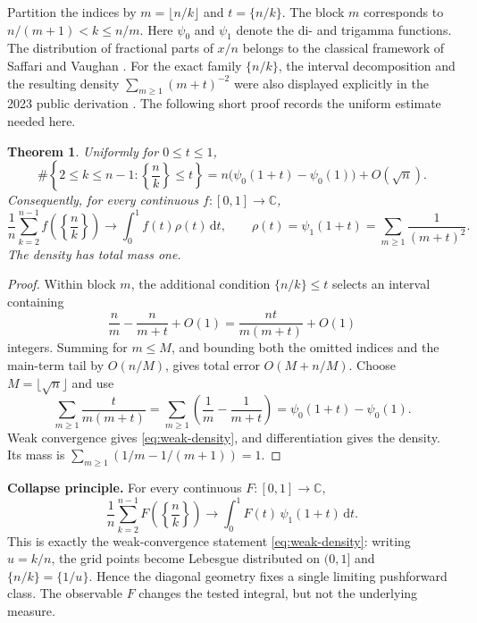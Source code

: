 \documentclass[11pt]{amsart}
\numberwithin{equation}{section}
\newtheorem{theorem}{Theorem}[section]
\theoremstyle{definition}
\theoremstyle{remark}
\newcommand{\C}{\mathbb C}
\newcommand{\dd}{\,\mathrm d}
\begin{document}
Partition the indices by
\(m=\lfloor n/k\rfloor\) and \(t=\{n/k\}\).  The block \(m\)
corresponds to \(n/(m+1)<k\leq n/m\).
Here \(\psi_0\) and \(\psi_1\) denote the di- and trigamma functions.
The distribution of fractional parts of \(x/n\) belongs to the classical
framework of Saffari and Vaughan \cite{SaffariVaughan1977}.  For the exact
family \(\{n/k\}\), the interval decomposition and the resulting density
\(\sum_{m\geq1}(m+t)^{-2}\) were also displayed explicitly in the 2023
public derivation \cite{MikeTeX2023}.  The following short proof records the
uniform estimate needed here.

\begin{theorem}\label{thm:block-count}
Uniformly for \(0\leq t\leq1\),
\begin{equation}\label{eq:block-count}
 \#\left\{2\leq k\leq n-1:\left\{\frac nk\right\}\leq t\right\}
 =n\bigl(\psi_0(1+t)-\psi_0(1)\bigr)+O(\sqrt n).
\end{equation}
Consequently, for every continuous \(f:[0,1]\to\C\),
\begin{equation}\label{eq:weak-density}
 \frac1n\sum_{k=2}^{n-1}f\!\left(\left\{\frac nk\right\}\right)
 \longrightarrow\int_0^1 f(t)\rho(t)\dd t,
 \qquad
 \rho(t)=\psi_1(1+t)=\sum_{m\geq1}\frac1{(m+t)^2}.
\end{equation}
The density has total mass one.
\end{theorem}

\begin{proof}
Within block \(m\), the additional condition \(\{n/k\}\leq t\) selects
an interval containing
\[
 \frac{n}{m}-\frac{n}{m+t}+O(1)
 =\frac{nt}{m(m+t)}+O(1)
\]
integers.  Summing for \(m\leq M\), and bounding both the omitted indices
and the main-term tail by \(O(n/M)\), gives total error
\(O(M+n/M)\).  Choose \(M=\lfloor\sqrt n\rfloor\) and use
\[
 \sum_{m\geq1}\frac{t}{m(m+t)}
 =\sum_{m\geq1}\left(\frac1m-\frac1{m+t}\right)
 =\psi_0(1+t)-\psi_0(1).
\]
Weak convergence gives \eqref{eq:weak-density}, and differentiation gives
the density.  Its mass is
\(\sum_{m\geq1}(1/m-1/(m+1))=1\).
\end{proof}

\medskip
\noindent\textbf{Collapse principle.}
For every continuous \(F:[0,1]\to\mathbb C\),
\begin{equation}\label{eq:collapse}
 \frac1n\sum_{k=2}^{n-1}F\!\left(\left\{\frac nk\right\}\right)
 \longrightarrow
 \int_0^1 F(t)\,\psi_1(1+t)\dd t.
\end{equation}
This is exactly the weak-convergence statement \eqref{eq:weak-density}:
writing \(u=k/n\), the grid points become Lebesgue distributed on
\((0,1]\) and \(\{n/k\}=\{1/u\}\).  Hence the diagonal geometry fixes a
single limiting pushforward class.  The observable \(F\) changes the tested
integral, but not the underlying measure.
\end{document}

